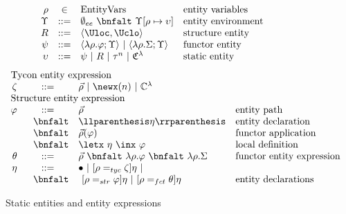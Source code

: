 \begin{figure}
\centering
\small
\[
\begin{array}{rcll}
   \rho & \in & \mathrm{EntityVars} & \textrm{entity variables}\\

	 \Upsilon & ::= & \emptyset_{ee}~\bnfalt~\Upsilon [\rho\mapsto\upsilon] & \textrm{entity environment} \\
	R & ::= & \langle \Uloc, \Uclo \rangle& \textrm{structure entity} \\ 
	\psi & ::= & \langle
        \lambda\rho.\varphi;\Upsilon\rangle~|~\langle \lambda\rho.\Sigma;\Upsilon\rangle & \textrm{functor entity}\\ 
	\upsilon & ::= &
        \psi~|~R~|~\tau^n~|~\mathfrak{C}^\lambda & \textrm{static entity} 
\end{array}
\]
\hrulefill
\[
\begin{array}{rcll}
        \multicolumn{3}{l}{\textrm{Tycon entity expression}}\\
        \zeta & ::= & \vec{\rho}~|~\newx(n)~|~\mathbb{C}^\lambda\\
	\multicolumn{3}{l}{\textrm{Structure entity expression}}\\
	\varphi & ::= & \vec{\rho} & \textrm{entity path}\\
	     & ~~\bnfalt & \llparenthesis \eta \rrparenthesis & \textrm{entity declaration}\\
	     & ~~\bnfalt & \vec{\rho}(\varphi) & \textrm{functor application}\\
	     & ~~\bnfalt & \letx~\eta~\inx~\varphi & \textrm{local definition}\\
	\theta & ::= &
        \vec{\rho}~\bnfalt~\lambda\rho.\varphi~\bnfalt~\lambda\rho.\Sigma
        & \textrm{functor entity expression}\\
	\eta & ::= & \bullet~|~[\rho=_{tyc}\zeta]\eta~| & \\
        & ~~\bnfalt &  ~[\rho =_{str}  \varphi]\eta~|~[\rho=_{fct}\theta]\eta
        & \textrm{entity declarations}\\
          
\end{array}
\]
\caption{Static entities and entity expressions}
\label{fig:entities}
\end{figure}
